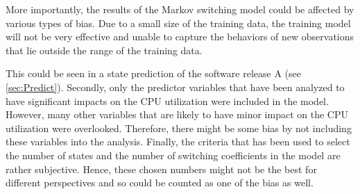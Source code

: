 More importantly, the results of the Markov switching model could
be affected by various types of bias. Due to a small size of the training
data, the training model will not be very effective and unable to
capture the behaviors of new observations that lie outside the range
of the training data. %
\begin{comment}
For this reason, a prediction for the new observations might not be
accurate as it should be. 
\end{comment}
This could be seen in a state prediction of the software release A
(see \ref{sec:Predict}). Secondly, only the predictor variables that
have been analyzed to have significant impacts on the CPU utilization
were included in the model. However, many other variables that are
likely to have minor impact on the CPU utilization were overlooked.
Therefore, there might be some bias by not including these variables
into the analysis. Finally, the criteria that has been used to select
the number of states and the number of switching coefficients in the
model are rather subjective. Hence, these chosen numbers might not
be the best for different perspectives and so could be counted as
one of the bias as well. %
\begin{comment}
other factors which are not considered in the model might also be
the reason of causing a bias. The chosen predictor variables in this
thesis are variables that have a partial prior knowledge and have
been analyzed to have some significant impacts on CPU utilization.
However, it is possible that there are still some explanatory information
that is overlooked. Finally, selecting the number of states and switching
coefficients in the model could cause a bias as well. Finally, selecting
the number of states and the number of switching coefficients in the
model could cause a bias as well. 
\end{comment}

\begin{comment}
As described above, the small dataset is proven to cause several problems
and difficulty to the analysis. The size of data is crucial in statistical
analysis because more information can be extracted and used as an
input for the model to learn. 
\end{comment}

